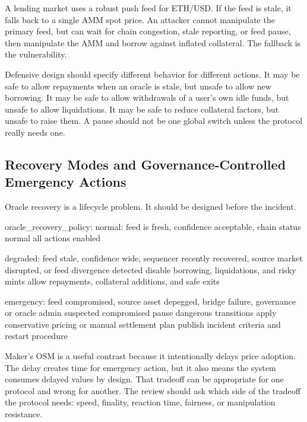 \begin{failuremodebox}
A lending market uses a robust push feed for ETH/USD. If the feed is stale, it falls back to a single AMM spot price. An attacker cannot manipulate the primary feed, but can wait for chain congestion, stale reporting, or feed pause, then manipulate the AMM and borrow against inflated collateral. The fallback is the vulnerability.
\end{failuremodebox}

Defensive design should specify different behavior for different actions. It may be safe to allow repayments when an oracle is stale, but unsafe to allow new borrowing. It may be safe to allow withdrawals of a user's own idle funds, but unsafe to allow liquidations. It may be safe to reduce collateral factors, but unsafe to raise them. A pause should not be one global switch unless the protocol really needs one.

\subsection{Recovery Modes and Governance-Controlled Emergency Actions}

Oracle recovery is a lifecycle problem. It should be designed before the incident.

\begin{codeblock}
oracle_recovery_policy:
    normal:
        feed is fresh, confidence acceptable, chain status normal
        all actions enabled

    degraded:
        feed stale, confidence wide, sequencer recently recovered,
        source market disrupted, or feed divergence detected
        disable borrowing, liquidations, and risky mints
        allow repayments, collateral additions, and safe exits

    emergency:
        feed compromised, source asset depegged, bridge failure,
        governance or oracle admin suspected compromised
        pause dangerous transitions
        apply conservative pricing or manual settlement plan
        publish incident criteria and restart procedure
\end{codeblock}

Maker's OSM is a useful contrast because it intentionally delays price adoption. The delay creates time for emergency action, but it also means the system consumes delayed values by design. That tradeoff can be appropriate for one protocol and wrong for another. The review should ask which side of the tradeoff the protocol needs: speed, finality, reaction time, fairness, or manipulation resistance.

